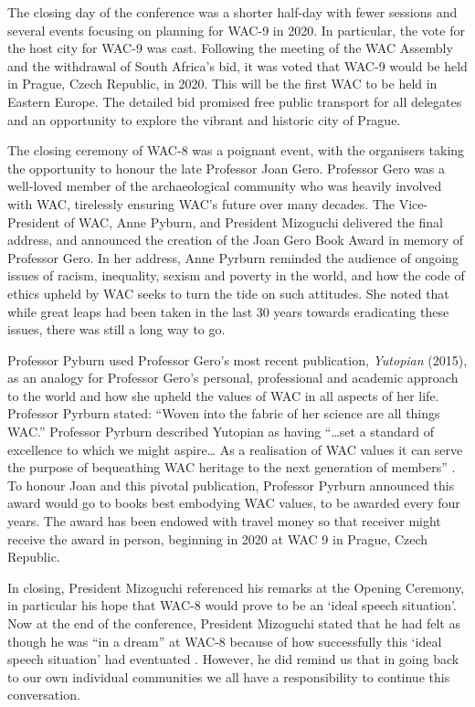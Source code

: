 \documentclass[spanish]{ijsra}
\begin{document}
The closing day of the conference was a shorter half-day with fewer sessions and several events focusing on planning for WAC-9 in 2020. In particular, the vote for the host city for WAC-9 was cast.  Following the meeting of the WAC Assembly and the withdrawal of South Africa’s bid, it was voted that WAC-9 would be held in Prague, Czech Republic, in 2020. This will be the first WAC to be held in Eastern Europe. The detailed bid promised free public transport for all delegates and an opportunity to explore the vibrant and historic city of Prague. 

The closing ceremony of WAC-8 was a poignant event, with the organisers taking the opportunity to honour the late Professor Joan Gero. Professor Gero was a well-loved member of the archaeological community who was heavily involved with WAC, tirelessly ensuring WAC’s future over many decades. The Vice-President of WAC, Anne Pyburn, and President Mizoguchi delivered the final address, and announced the creation of the Joan Gero Book Award in memory of Professor Gero. In her address, Anne Pyrburn reminded the audience of ongoing issues of racism, inequality, sexism and poverty in the world, and how the code of ethics upheld by WAC seeks to turn the tide on such attitudes. She noted that while great leaps had been taken in the last 30 years towards eradicating these issues, there was still a long way to go. 

Professor Pyburn used Professor Gero’s most recent publication, \textit{Yutopian} (2015), as an analogy for Professor Gero’s personal, professional and academic approach to the world and how she upheld the values of WAC in all aspects of her life. Professor Pyrburn stated: “Woven into the fabric of her science are all things WAC.” Professor Pyrburn described Yutopian as having “…set a standard of excellence to which we might aspire… As a realisation of WAC values it can serve the purpose of bequeathing WAC heritage to the next generation of members” \parencite{closingWAC}. To honour Joan and this pivotal publication, Professor Pyrburn announced this award would go to books best embodying WAC values, to be awarded every four years. The award has been endowed with travel money so that receiver might receive the award in person, beginning in 2020 at WAC 9 in Prague, Czech Republic. 

In closing, President Mizoguchi referenced his remarks at the Opening Ceremony, in particular his hope that WAC-8 would prove to be an ‘ideal speech situation’. Now at the end of the conference, President Mizoguchi stated that he had felt as though he was “in a dream” at WAC-8 because of how successfully this ‘ideal speech situation’ had eventuated \parencite{closingWAC}. However, he did remind us that in going back to our own individual communities we all have a responsibility to continue this conversation. 
\end{document}
